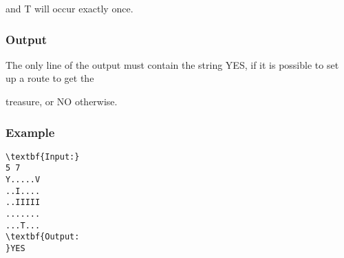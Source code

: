 and T will occur exactly once.

\subsubsection{Output}

The only line of the output must contain the string YES, if it is possible to set up a route to get the

treasure, or NO otherwise.

\subsubsection{Example}
\begin{verbatim}
\textbf{Input:}
5 7
Y.....V
..I....
..IIIII
.......
...T...
\textbf{Output:
}YES\end{verbatim}